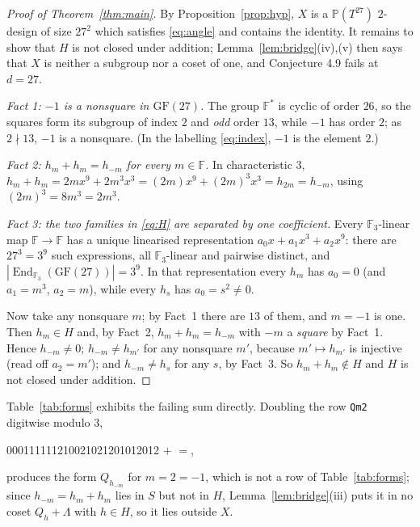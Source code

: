 \documentclass[11pt]{amsart}
\theoremstyle{remark}
\newcommand{\Fq}{\mathbb{F}}
\newcommand{\GF}{\mathrm{GF}}
\begin{document}
\begin{proof}[Proof of Theorem~\ref{thm:main}]
By Proposition~\ref{prop:hyp}, $X$ is a $\mathbb P(T^{27})$ $2$-design of size
$27^{2}$ which satisfies \eqref{eq:angle} and contains the identity. It remains
to show that $H$ is not closed under addition; Lemma~\ref{lem:bridge}(iv),(v)
then says that $X$ is neither a subgroup nor a coset of one, and
Conjecture 4.9 fails at $d=27$.

\emph{Fact 1: $-1$ is a nonsquare in $\GF(27)$.} The group $\Fq^{*}$ is cyclic
of order $26$, so the squares form its subgroup of index $2$ and \emph{odd}
order $13$, while $-1$ has order $2$; as $2\nmid13$, $-1$ is a nonsquare. (In
the labelling \eqref{eq:index}, $-1$ is the element $2$.)

\emph{Fact 2: $h_{m}+h_{m}=h_{-m}$ for every $m\in\Fq$.} In characteristic $3$,
$h_{m}+h_{m}=2mx^{9}+2m^{3}x^{3}=(2m)x^{9}+(2m)^{3}x^{3}=h_{2m}=h_{-m}$, using
$(2m)^{3}=8m^{3}=2m^{3}$.

\emph{Fact 3: the two families in \eqref{eq:H} are separated by one
coefficient.} Every $\Fq_{3}$-linear map $\Fq\to\Fq$ has a unique linearised
representation $a_{0}x+a_{1}x^{3}+a_{2}x^{9}$: there are $27^{3}=3^{9}$ such
expressions, all $\Fq_{3}$-linear and pairwise distinct, and
$|\operatorname{End}_{\Fq_{3}}(\GF(27))|=3^{9}$. In that representation every
$h_{m}$ has $a_{0}=0$ (and $a_{1}=m^{3}$, $a_{2}=m$), while every $h_{s}$ has
$a_{0}=s^{2}\neq0$.

Now take any nonsquare $m$; by Fact~1 there are $13$ of them, and $m=-1$ is one.
Then $h_{m}\in H$ and, by Fact~2, $h_{m}+h_{m}=h_{-m}$ with $-m$ a \emph{square}
by Fact~1. Hence $h_{-m}\neq0$; $h_{-m}\neq h_{m'}$ for any nonsquare $m'$,
because $m'\mapsto h_{m'}$ is injective (read off $a_{2}=m'$); and
$h_{-m}\neq h_{s}$ for any $s$, by Fact~3. So $h_{m}+h_{m}\notin H$ and $H$ is
not closed under addition.
\end{proof}

\noindent
Table~\ref{tab:forms} exhibits the failing sum directly. Doubling the row
\texttt{Qm2} digitwise modulo $3$,
\begin{center}
\ttfamily\footnotesize
000111111210021021201012012 \quad$+$
\quad$=$,
\end{center}
produces the form $Q_{h_{-m}}$ for $m=2=-1$, which is not a row of
Table~\ref{tab:forms}; since $h_{-m}=h_{m}+h_{m}$ lies in $S$ but not in $H$,
Lemma~\ref{lem:bridge}(iii) puts it in no coset $Q_{h}+\Lambda$ with $h\in H$, so
it lies outside $X$.
\end{document}
